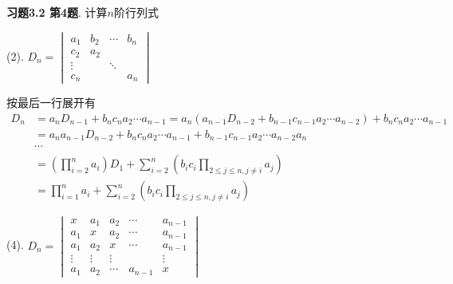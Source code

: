 \newpageorvspace

{\bf 习题3.2 第4题}. 计算$n$阶行列式

(2). $D_n = \begin{vmatrix}
a_1 & b_2 & \cdots & b_n \\ c_2 & a_2 & & \\ \vdots & & \ddots & \\ c_n & & & a_n
\end{vmatrix}$

按最后一行展开有
\begin{align*}
D_n & = a_nD_{n-1} + b_nc_na_2\cdots a_{n-1} = a_n(a_{n-1}D_{n-2} + b_{n-1}c_{n-1}a_2\cdots a_{n-2}) + b_nc_na_2\cdots a_{n-1} \\
& = a_na_{n-1}D_{n-2} + b_nc_na_2\cdots a_{n-1} + b_{n-1}c_{n-1}a_2\cdots a_{n-2}a_n \\
& \cdots \\
& = \left( \prod_{i=2}^n a_i \right) D_1 + \sum_{i=2}^n \left( b_ic_i \prod_{2 \leqslant j \leqslant n, j \neq i} a_j \right) \\
& = \prod_{i=1}^n a_i + \sum_{i=2}^n \left( b_ic_i \prod_{2 \leqslant j \leqslant n, j \neq i} a_j \right)
\end{align*}

(4). $D_n = \begin{vmatrix}
x & a_1 & a_2 & \cdots & a_{n-1} \\ a_1 & x & a_2 & \cdots & a_{n-1} \\ a_1 & a_2 & x & \cdots & a_{n-1} \\ \vdots & \vdots & \vdots & & \vdots \\ a_1 & a_2 & \cdots & a_{n-1} & x
\end{vmatrix}$

